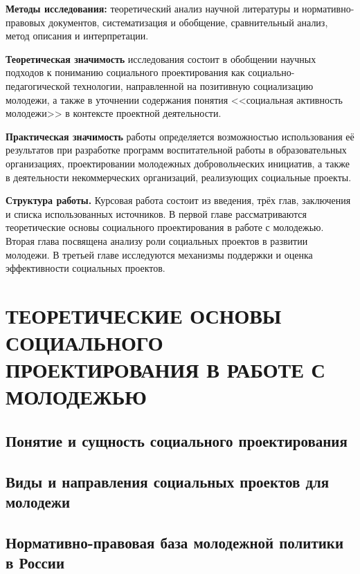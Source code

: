 \documentclass[14pt,a4paper]{extarticle}
\begin{document}
\textbf{Методы исследования:} теоретический анализ научной литературы и нормативно-правовых документов, систематизация и обобщение, сравнительный анализ, метод описания и интерпретации.

\textbf{Теоретическая значимость} исследования состоит в обобщении научных подходов к пониманию социального проектирования как социально-педагогической технологии, направленной на позитивную социализацию молодежи, а также в уточнении содержания понятия <<социальная активность молодежи>> в контексте проектной деятельности.

\textbf{Практическая значимость} работы определяется возможностью использования её результатов при разработке программ воспитательной работы в образовательных организациях, проектировании молодежных добровольческих инициатив, а также в деятельности некоммерческих организаций, реализующих социальные проекты.

\textbf{Структура работы.} Курсовая работа состоит из введения, трёх глав, заключения и списка использованных источников. В первой главе рассматриваются теоретические основы социального проектирования в работе с молодежью. Вторая глава посвящена анализу роли социальных проектов в развитии молодежи. В третьей главе исследуются механизмы поддержки и оценка эффективности социальных проектов.

\newpage
\section{ТЕОРЕТИЧЕСКИЕ ОСНОВЫ СОЦИАЛЬНОГО ПРОЕКТИРОВАНИЯ В РАБОТЕ С МОЛОДЕЖЬЮ}

\subsection{Понятие и сущность социального проектирования}


\subsection{Виды и направления социальных проектов для молодежи}


\subsection{Нормативно-правовая база молодежной политики в России}
\end{document}
